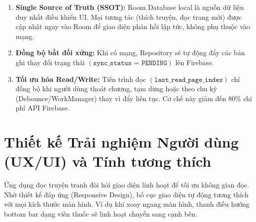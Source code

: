 
\begin{enumerate}     
    \item \textbf{Single Source of Truth (SSOT):} Room Database local là nguồn dữ liệu duy nhất điều khiển UI. Mọi tương tác (thích truyện, đọc trang mới) được cập nhật ngay vào Room để giao diện phản hồi lập tức, không phụ thuộc vào mạng.
    \item \textbf{Đồng bộ bất đối xứng:} Khi có mạng, Repository sẽ tự động đẩy các bản ghi thay đổi trạng thái \((\texttt{sync\_status = PENDING})\) lên Firebase.
    \item \textbf{Tối ưu hóa Read/Write:} Tiến trình đọc \((\texttt{last\_read\_page\_index})\) chỉ đồng bộ khi người dùng thoát chương, tạm dừng hoặc theo chu kỳ (Debounce/WorkManager) thay vì đẩy liên tục. Cơ chế này giảm đến 80\% chi phí API Firebase.
\end{enumerate}

\section{Thiết kế Trải nghiệm Người dùng (UX/UI) và Tính tương thích}

Ứng dụng đọc truyện tranh đòi hỏi giao diện linh hoạt để tối ưu không gian đọc. Nhờ thiết kế đáp ứng (Responsive Design), bố cục giao diện tự động tương thích với mọi kích thước màn hình. Ví dụ khi xoay ngang màn hình, thanh điều hướng bottom bar dạng viên thuốc sẽ linh hoạt chuyển sang cạnh bên.

